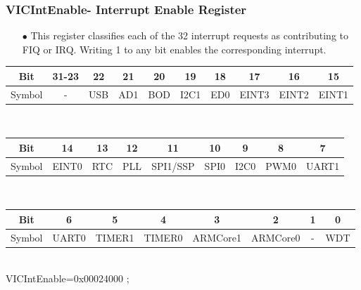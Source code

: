 \documentclass[table,10pt,red]{beamer}
\begin{document}
\begin{frame}
	\frametitle{VICIntEnable- Interrupt Enable Register}
	\begin{itemize}
		\item[$\bullet$] This register classifies each of the 32 interrupt requests as contributing to FIQ or IRQ. Writing 1 to any bit enables the corresponding interrupt. 
	\end{itemize}  \pause 
	\footnotesize
	\begin{tabular}{|c|c|c|c|c|c|c|c|c|c|}
		\hline Bit & 31-23 & 22 & 21 & 20 & 19 & 18 & 17 & 16 & 15 \\ 
		\hline Symbol & - & USB & AD1 & BOD & I2C1 & ED0 & EINT3 & EINT2 & EINT1 \\ 
		\hline 
	\end{tabular}
	\\[10pt]
	\begin{tabular}{|c|c|c|c|c|c|c|c|c|}
		\hline Bit & 14 & 13 & 12 & 11 & 10 & 9 & 8 & 7\\ 
		\hline Symbol & EINT0 & RTC & PLL & SPI1/SSP & SPI0 & I2C0 & PWM0 & UART1 \\ 
		\hline 
	\end{tabular}
	\\[10pt]
	\begin{tabular}{|c|c|c|c|c|c|c|c|}
		\hline Bit & 6 & 5 & 4 & 3 & 2 & 1 & 0 \\ 
		\hline Symbol & UART0 & TIMER1 & TIMER0 & ARMCore1 & ARMCore0 & - & WDT \\ 
		\hline 
	\end{tabular} 
	\\[10pt]
	\small
	VICIntEnable\hspace{1pt}=\hspace{1pt}\color{red}0x00024000 \color{black};
\end{frame}
\end{document}
